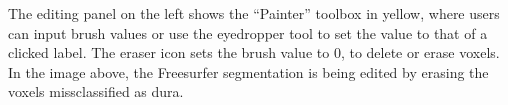 \label{fig:edit}
The editing panel on the left shows the ``Painter'' toolbox in yellow, where users can input brush values or use the eyedropper tool to set the value to that of a clicked label. The eraser icon sets the brush value to 0, to delete or erase voxels. In the image above, the Freesurfer segmentation is being edited by erasing the voxels missclassified as dura. 